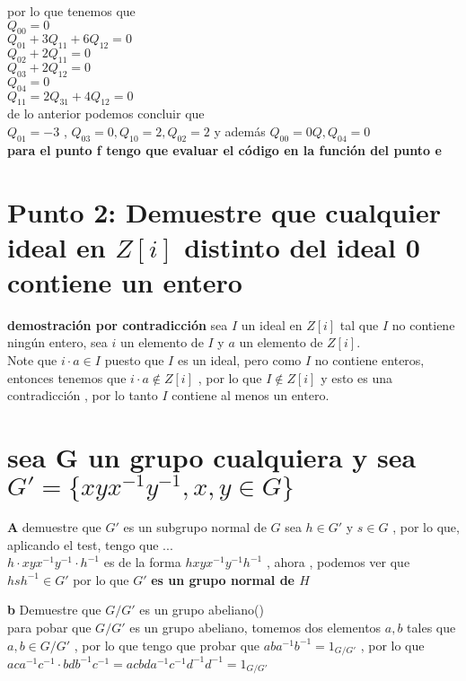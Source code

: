\documentclass[10pt,a4paper]{article} %
\begin{document}
    por lo que tenemos que
    \\
    $Q_{00} =  0 $
    \\
    $Q_{01}  + 3Q_{11} + 6Q_{12} = 0$
    \\
    $Q_{02} + 2Q_{11} = 0$
    \\
    $Q_{03} + 2Q_{12} = 0$
    \\
    $Q_{04} = 0$
    \\
    $Q_{11} = 2Q_{31} + 4Q_{12} = 0$
    \\
    de lo anterior podemos concluir que
    \\
    $Q_{01} = -3$ , $Q_{03} = 0 ,  Q_{10} = 2 , Q_{02} = 2$ y además $Q_{00} =
    0Q, Q_{04} = 0$
    \\
    \textbf{para el punto f tengo que evaluar el código en la función del punto e}




    \section{Punto 2: Demuestre que cualquier ideal en $Z[i]$ distinto del
    ideal 0 contiene un entero}
    \textbf{demostración por contradicción}
    sea $I$ un ideal en $Z[i]$ tal que $I$ no contiene ningún entero, sea $i$
    un elemento de $I$ y $a$ un elemento de $Z[i]$.
    \\
    Note que $i \cdot a \in I$ puesto que $I$ es un ideal, pero como $I$ no
    contiene enteros, entonces tenemos que $i \cdot a \notin Z[i]$ , por lo que
    $I \notin Z[i]$ y esto es una contradicción , por lo tanto $I$ contiene al
    menos un entero.





    \section{sea G un grupo cualquiera y sea $G' = \{xyx ^{-1} y ^{-1} ,  x , y
    \in G   \}$}
    \textbf{A}
    demuestre que $G'$ es un subgrupo normal de $G$
    sea $h \in G'$ y $s \in G$ , por lo que, aplicando el test, tengo que ...
    \\
    $h \cdot  xyx ^{-1} y ^{-1} \cdot h ^{-1}   $ es de la forma $hxyx ^{-1}  y
    ^{-1}  h ^{-1} $ , ahora , podemos ver que $hsh ^{-1}  \in G'$ por lo que
    $G'$ \textbf{es un grupo normal de $H$}



    \textbf{b}
    Demuestre  que $G/G'$ es un grupo abeliano()
    \\
    para pobar que $G/G'$ es un grupo abeliano, tomemos dos elementos $a,b$
    tales que $a,b \in G/G'$ , por lo que tengo que probar que $aba ^{-1} b
    ^{-1}  = 1_{G/G'}$ , por lo que
    \\
    $ac a ^{-1} c ^{-1} \cdot  bdb ^{-1} c ^{-1}  = acbda ^{-1} c ^{-1} d ^{-1}
    d ^{-1}  = 1_{G/G'}     $
\end{document}
